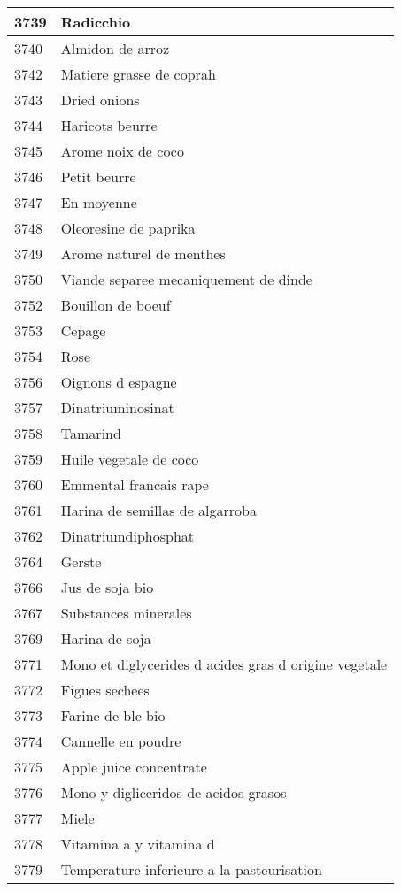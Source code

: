 \begin{longtable}{|l|l|}
3739 & Radicchio \\ \hline 
3740 & Almidon de arroz \\ \hline 
3742 & Matiere grasse de coprah \\ \hline 
3743 & Dried onions \\ \hline 
3744 & Haricots beurre \\ \hline 
3745 & Arome noix de coco \\ \hline 
3746 & Petit beurre \\ \hline 
3747 & En moyenne \\ \hline 
3748 & Oleoresine de paprika \\ \hline 
3749 & Arome naturel de menthes \\ \hline 
3750 & Viande separee mecaniquement de dinde \\ \hline 
3752 & Bouillon de boeuf \\ \hline 
3753 & Cepage \\ \hline 
3754 & Rose \\ \hline 
3756 & Oignons d espagne \\ \hline 
3757 & Dinatriuminosinat \\ \hline 
3758 & Tamarind \\ \hline 
3759 & Huile vegetale de coco \\ \hline 
3760 & Emmental francais rape \\ \hline 
3761 & Harina de semillas de algarroba \\ \hline 
3762 & Dinatriumdiphosphat \\ \hline 
3764 & Gerste \\ \hline 
3766 & Jus de soja bio \\ \hline 
3767 & Substances minerales \\ \hline 
3769 & Harina de soja \\ \hline 
3771 & Mono et diglycerides d acides gras d origine vegetale \\ \hline 
3772 & Figues sechees \\ \hline 
3773 & Farine de ble bio \\ \hline 
3774 & Cannelle en poudre \\ \hline 
3775 & Apple juice concentrate \\ \hline 
3776 & Mono y digliceridos de acidos grasos \\ \hline 
3777 & Miele \\ \hline 
3778 & Vitamina a y vitamina d \\ \hline 
3779 & Temperature inferieure a la pasteurisation \\ \hline 

\end{longtable}
